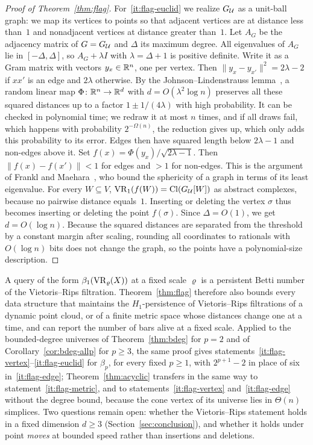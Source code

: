 \begin{proof}[Proof of Theorem~\ref{thm:flag}]
For~\ref{it:flag-euclid} we realize $G_{\mathcal{U}}$ as a unit-ball graph: we map its vertices to points so that adjacent vertices are at distance less than~$1$ and nonadjacent vertices at distance greater than~$1$.
Let $A_G$ be the adjacency matrix of $G=G_{\mathcal{U}}$ and $\Delta$ its maximum degree.
All eigenvalues of $A_G$ lie in $[-\Delta,\Delta]$, so $A_G+\lambda I$ with $\lambda=\Delta+1$ is positive definite.
Write it as a Gram matrix with vectors $y_x\in\mathbb{R}^{n}$, one per vertex.
Then $\lVert y_x-y_{x'}\rVert^2=2\lambda-2$ if $xx'$ is an edge and $2\lambda$ otherwise.
By the Johnson--Lindenstrauss lemma~\cite{DG03}, a random linear map $\Phi\colon\mathbb{R}^{n}\to\mathbb{R}^{d}$ with $d=O(\lambda^2\log n)$ preserves all these squared distances up to a factor $1\pm1/(4\lambda)$ with high probability.
It can be checked in polynomial time; we redraw it at most $n$ times, and if all draws fail, which happens with probability $2^{-\Omega(n)}$, the reduction gives up, which only adds this probability to its error.
Edges then have squared length below $2\lambda-1$ and non-edges above it.
Set $f(x)=\Phi(y_x)/\sqrt{2\lambda-1}$.
Then $\lVert f(x)-f(x')\rVert<1$ for edges and $>1$ for non-edges.
This is the argument of Frankl and Maehara~\cite{FM88}, who bound the sphericity of a graph in terms of its least eigenvalue.
For every $W\subseteq V$, $\mathrm{VR}_1(f(W))=\mathrm{Cl}(G_{\mathcal{U}}[W])$ as abstract complexes, because no pairwise distance equals~$1$.
Inserting or deleting the vertex $\sigma$ thus becomes inserting or deleting the point $f(\sigma)$.
Since $\Delta=O(1)$, we get $d=O(\log n)$.
Because the squared distances are separated from the threshold by a constant margin after scaling, rounding all coordinates to rationals with $O(\log n)$ bits does not change the graph, so the points have a polynomial-size description.
\end{proof}

A query of the form $\beta_1(\mathrm{VR}_\varrho(X))$ at a fixed scale $\varrho$ is a persistent Betti number of the Vietoris--Rips filtration.
Theorem~\ref{thm:flag} therefore also bounds every data structure that maintains the $H_1$-persistence of Vietoris--Rips filtrations of a dynamic point cloud, or of a finite metric space whose distances change one at a time, and can report the number of bars alive at a fixed scale.
Applied to the bounded-degree universes of Theorem~\ref{thm:bdeg} for $p=2$ and of Corollary~\ref{cor:bdeg-allp} for $p\ge3$, the same proof gives statements~\ref{it:flag-vertex}--\ref{it:flag-euclid} for $\beta_p$, for every fixed $p\ge1$, with $2^{p+1}-2$ in place of six in~\ref{it:flag-edge}; Theorem~\ref{thm:acyclic} transfers in the same way to statement~\ref{it:flag-metric}, and to statements~\ref{it:flag-vertex} and~\ref{it:flag-edge} without the degree bound, because the cone vertex of its universe lies in $\Theta(n)$ simplices.
Two questions remain open: whether the Vietoris--Rips statement holds in a fixed dimension $d\ge3$ (Section~\ref{sec:conclusion}), and whether it holds under point \emph{moves} at bounded speed rather than insertions and deletions.


